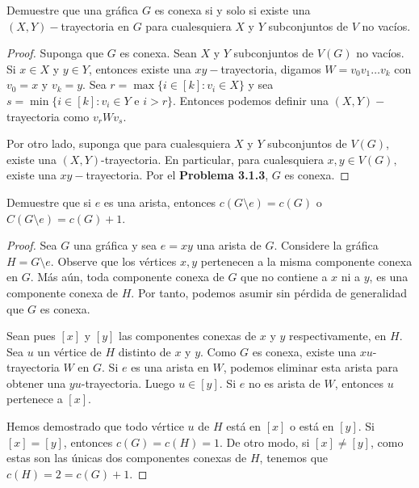 \documentclass[12pt]{article}
\newenvironment{problem}[2][Problema]{\begin{trivlist}
\item[\hskip \labelsep {\bfseries #1}\hskip \labelsep {\bfseries #2.}]}{\end{trivlist}}
\begin{document}
\begin{problem}{3.1.4} Demuestre que una gráfica $G$ es conexa si y solo si existe una \\$(X, Y)-$trayectoria en $G$ para cualesquiera $X$ y $Y$ subconjuntos de $V$ no vacíos.
\end{problem}
\begin{proof}
Suponga que $G$ es conexa. Sean $X$ y $Y$ subconjuntos de $V(G)$ no vacíos. Si $x \in X$ y $y \in Y$, entonces existe una $xy-$trayectoria, digamos $W = v_0 v_1 \ldots v_k$ con $v_0 = x$ y $v_k = y$. Sea $r = \max \{i \in [k]: v_i \in X \}$ y sea $s = \min \{i \in [k]: v_i \in Y \text{ e } i > r\}$. Entonces podemos definir una $(X, Y)-$trayectoria como $v_r W v_s.$

Por otro lado, suponga que para cualesquiera $X$ y  $Y$ subconjuntos de $V(G)$, existe una $(X,Y)$-trayectoria. En particular, para cualesquiera $x, y \in V(G),$  existe una $xy-$trayectoria. Por el \textbf{Problema 3.1.3}, $G$ es conexa.  
\end{proof}

\begin{problem}{3.2.1} Demuestre que si $e$ es una arista, entonces $c(G\setminus e) = c(G)$ o $C(G\setminus e) = c(G) + 1$.
\end{problem}
\begin{proof}

Sea $G$ una gráfica y sea $e = xy$ una arista de $G$. Considere la gráfica $H = G \setminus e$. 
Observe que los vértices $x,y$ pertenecen a la misma componente conexa en $G$. Más aún, toda componente conexa de $G$ que no contiene a $x$ ni a $y$, es una componente conexa de $H.$ Por tanto, podemos asumir sin pérdida de generalidad que $G$ es conexa. 

Sean pues $[x]$ y $[y]$ las componentes conexas de $x$ y $y$ respectivamente, en $H.$ Sea $u$ un vértice de $H$ distinto de $x$ y $y$. Como $G$ es conexa, existe una $xu$-trayectoria $W$ en $G.$ Si $e$ es una arista en $W$, podemos eliminar esta arista para obtener una $yu$-trayectoria. Luego $u \in [y]$. Si $e$ no es arista de $W$, entonces $u$ pertenece a $[x].$ 

Hemos demostrado que todo vértice $u$ de $H$ está en $[x]$ o está en $[y]$. Si $[x] = [y]$, entonces $c(G) = c(H) =1$. De otro modo, si $[x] \neq [y]$, como estas son las únicas dos componentes conexas de $H$, tenemos que $c(H) = 2 = c(G) + 1.$

\end{proof}
\end{document}

